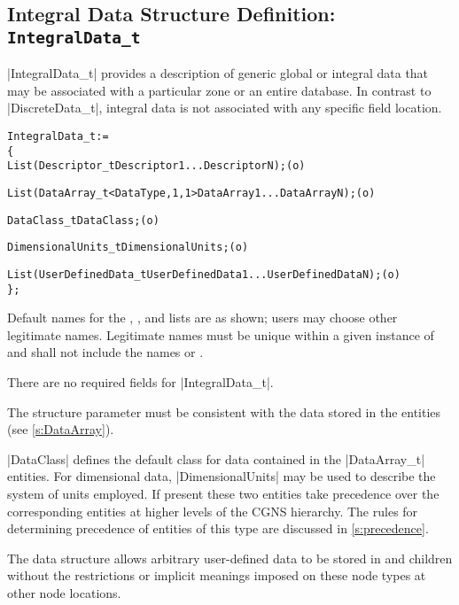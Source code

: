 \subsection{Integral Data Structure Definition: \texttt{IntegralData\_t}} 
\label{s:IntegralData}

|IntegralData_t| provides a description of generic global or integral data
that may be associated with a particular zone or an entire database.
In contrast to |DiscreteData_t|, integral data is not associated with
any specific field location.
\begin{alltt}
  IntegralData\_t :=
    \{
    List( Descriptor\_t Descriptor1 ... DescriptorN ) ;                      (o)

    List( DataArray\_t<DataType, 1, 1> DataArray1 ... DataArrayN ) ;         (o)

    DataClass\_t DataClass ;                                                 (o)
    
    DimensionalUnits\_t DimensionalUnits ;                                   (o)

    List( UserDefinedData\_t UserDefinedData1 ... UserDefinedDataN ) ;       (o)
    \} ;
\end{alltt}

\begin{notes}
\item
 Default names for the , , and
 lists are as shown; users may choose other legitimate names.
 Legitimate names must be unique within a given instance of
  and shall not include the names 
 or .
\item
 There are no required fields for |IntegralData_t|.  
\item
 The structure parameter  must be consistent with the
 data stored in the  entities (see \autoref{s:DataArray}).
\end{notes}

|DataClass| defines the default class for data contained in the
|DataArray_t| entities.
For dimensional data, |DimensionalUnits| may be used to describe the
system of units employed.
If present these two entities take precedence over the corresponding
entities at higher levels of the CGNS hierarchy.
The rules for determining precedence of entities of this type are
discussed in \autoref{s:precedence}.

The  data structure allows arbitrary
user-defined data to be stored in  and
 children without the restrictions or implicit
meanings imposed on these node types at other node locations.

